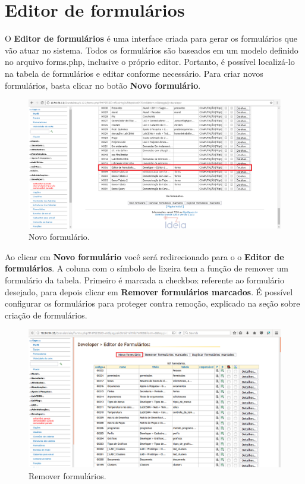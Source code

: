 \documentclass[9pt]{report}
\begin{document}
{   \section{Editor de formulários}

   O \textbf{Editor de formulários} é uma interface criada para gerar
   os formulários que vão atuar no sistema. Todos os formulários são
   baseados em um modelo definido no arquivo forms.php, inclusive o
   próprio editor. Portanto, é possível localizá-lo na tabela de
   formulários e editar conforme necessário. Para criar novos
   formulários, basta clicar no botão \textbf{Novo formulário}.

    \begin{figure}[H]
      \includegraphics[width=\textwidth]{2_Formularios/1_Editor_de_formularios/3.png}
      \caption{Novo formulário.}
      \label{fig:novoform}
    \end{figure}

    Ao clicar em \textbf{Novo formulário} você será redirecionado
    para o o \textbf{Editor de formulários}. A coluna com o símbolo
    de lixeira tem a função de remover um formulário da tabela.
    Primeiro é marcada a checkbox referente ao formulário desejado,
    para depois clicar em \textbf{Remover formulários marcados}.
    É possível configurar os formulários para proteger contra
    remoção, explicado na seção sobre criação de formulários.

    \begin{figure}[H]
      \includegraphics[width=\textwidth]{2_Formularios/1_Editor_de_formularios/4.png}
      \caption{Remover formulários.}
      \label{fig:removerform}
    \end{figure}

}
\end{document}
